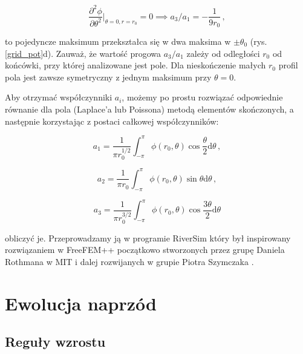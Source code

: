 \documentclass[]{pracamgr}
\begin{document}
    \begin{equation}\label{a3a1}
      \frac{\partial^2 \phi}{\partial \theta^2}\big|_{\theta=0, r=r_0} = 0 \implies a_3/a_1 = -\frac{1}{9 r_0} \,, 
    \end{equation}
    
    to pojedyncze maksimum przekształca się w dwa maksima w $\pm \theta_0$ (rys. \ref{grid_pot}d). Zauważ, że wartość progowa $a_3/a_1$ zależy od odległości $r_0$ od końcówki, przy której analizowane jest pole. Dla nieskończenie małych $r_0$ profil pola jest zawsze symetryczny z jednym maksimum przy $\theta=0$.

    Aby otrzymać współczynniki $a_i$, możemy po prostu rozwiązać odpowiednie równanie dla pola (Laplace'a lub Poissona) metodą elementów skończonych, a następnie korzystając z postaci całkowej współczynników:
    
    \begin{equation}
      \label{a1}
      a_1 = \frac{1}{\pi r_0^{1/2}}\int^{\pi}_{-\pi} \phi(r_0,\theta)\cos\frac{\theta}{2}\textrm{d}\theta \,,
    \end{equation} 
    
    \begin{equation}
      \label{a2}
      a_2 = \frac{1}{\pi r_0}\int^{\pi}_{-\pi} \phi(r_0,\theta)\sin\theta \textrm{d}\theta \,,
    \end{equation}
    
    \begin{equation}
      \label{a3}
      a_3 = \frac{1}{\pi r_0^{3/2}}\int^{\pi}_{-\pi} \phi(r_0,\theta)\cos\frac{3\theta}{2}\textrm{d}\theta
    \end{equation}	
    
    obliczyć je. Przeprowadzamy ją w programie RiverSim który był inspirowany rozwiązaniem w FreeFEM++\cite{hecht2012new} początkowo stworzonych przez grupę Daniela Rothmana w MIT \cite{petroff2011geometry, petroff2013bifurcation, cohen2015path} i dalej rozwijanych w grupie Piotra Szymczaka \cite{morawiecki2016problem, zukowski2019zwiazek}.



  \chapter{Ewolucja naprzód}
    
    \section{Reguły wzrostu}
\end{document}
